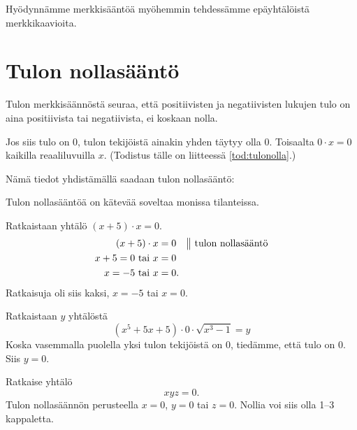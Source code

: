 Hyödynnämme merkkisääntöä myöhemmin tehdessämme epäyhtälöistä merkkikaavioita.

\section*{Tulon nollasääntö}

Tulon merkkisäännöstä seuraa, että positiivisten ja negatiivisten lukujen tulo on aina positiivista tai negatiivista, ei koskaan nolla.

Jos siis tulo on $0$, tulon tekijöistä ainakin yhden täytyy olla $0$. Toisaalta $0\cdot x = 0$ kaikilla reaaliluvuilla $x$.
(Todistus tälle on liitteessä \ref{tod:tulonolla}.)

Nämä tiedot yhdistämällä saadaan tulon nollasääntö:


Tulon nollasääntöä on kätevää soveltaa monissa tilanteissa.

\begin{esimerkki} Ratkaistaan yhtälö $(x+5) \cdot x =0 $.
    \begin{align*}
        (x+5)\cdot x &=0 \quad \big\| \text{ tulon nollasääntö} \\
        x +5= 0 \text{ tai } x &=0 \\
        x= -5 \text{ tai } x &=0.
    \end{align*}
    Ratkaisuja oli siis kaksi, $x= -5$ tai $x= 0$.
\end{esimerkki}


\begin{esimerkki} Ratkaistaan $y$ yhtälöstä
    \[(x^5+5x+5)\cdot 0\cdot \sqrt{x^3-1} =y\]
    Koska vasemmalla puolella yksi tulon tekijöistä on $0$, tiedämme, että tulo on $0$. Siis $y=0$.
\end{esimerkki}

\begin{esimerkki} Ratkaise yhtälö
    \[xyz=0.\]
Tulon nollasäännön perusteella $x=0$, $y=0$ tai $z=0$. Nollia voi siis
olla 1--3 kappaletta.
\end{esimerkki}

